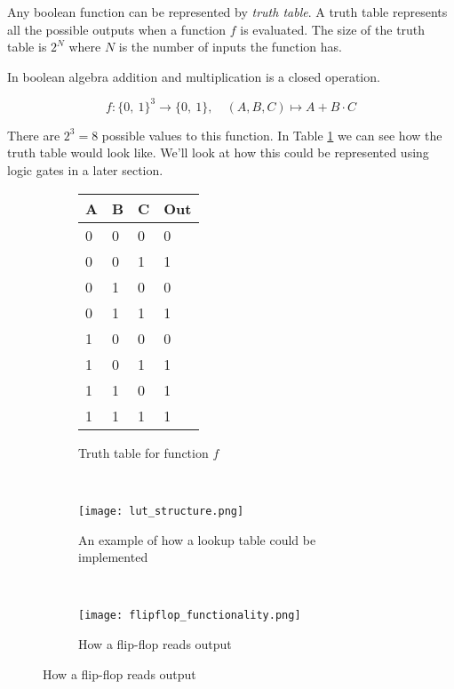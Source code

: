 \begin{example}
    \label{ex:boolean_function}
    Any boolean function can be represented by \textit{truth table}. A truth
    table represents all the possible outputs when a function $f$ is evaluated.
    The size of the truth table is $2^N$ where $N$ is the number of inputs the
    function has.

    In boolean algebra addition and multiplication is a closed operation.

    \[
    f \colon \{0,\ 1\}^3 \rightarrow \{0,\ 1\}, \quad (A, B, C) \mapsto A + B \cdot C
    \]

    There are $2^3 = 8$ possible values to this function. In Table
    \ref{tab:example_truth_table} we can see how the truth table would look
    like. We'll look at how this could be represented using logic gates in
    a later section.

    \begin{figure}
        \begin{subfigure}[b]{.4\textwidth}
        \centering
            \begin{tabular}{|l|l|l|l|}
                \hline
                A & B & C & Out \\ \hline
                0 & 0 & 0 & 0   \\ \hline
                0 & 0 & 1 & 1   \\ \hline
                0 & 1 & 0 & 0   \\ \hline
                0 & 1 & 1 & 1   \\ \hline
                1 & 0 & 0 & 0   \\ \hline
                1 & 0 & 1 & 1   \\ \hline
                1 & 1 & 0 & 1   \\ \hline
                1 & 1 & 1 & 1   \\ \hline
            \end{tabular}
            \caption{Truth table for function $f$}
            \label{tab:example_truth_table}
        \end{subfigure}
        ~
        \begin{subfigure}[b]{.4\textwidth}
            \centering
            \texttt{[image: lut\_structure.png]}
            \caption{An example of how a lookup table could be implemented}
            \label{fig:lut_flipflop}
        \end{subfigure}
        \\
        \centering
        \begin{subfigure}[b]{.4\textwidth}
            \centering
            \texttt{[image: flipflop\_functionality.png]}
            \caption{How a flip-flop reads output}
            \label{fig:flipflop_func}
        \end{subfigure}
    \end{figure}
\end{example}

